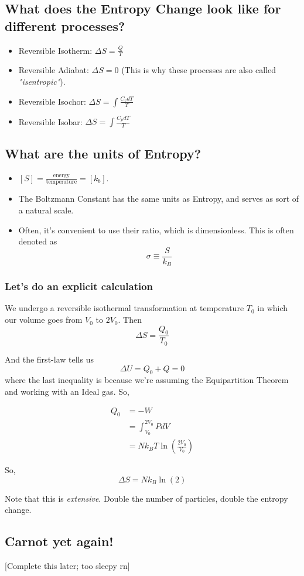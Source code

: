 \documentclass{article}
\begin{document}
\vskip 1cm
\subsection*{What does the Entropy Change look like for different processes?}

\vskip 0.5cm
\begin{itemize}
  \item Reversible Isotherm: $\Delta S = \frac{Q}{T}$
  \item Reversible Adiabat: $\Delta S = 0$ (This is why these processes are also called \emph{"isentropic"}).
  \item Reversible Isochor: $\Delta S = \int \frac{C_v dT}{T}$
  \item Reversible Isobar: $\Delta S = \int \frac{C_p dT}{T}$
\end{itemize}

\vskip 0.5cm
\subsection*{What are the units of Entropy?}
\vskip 0.5cm
\begin{itemize}
  \item $[S] = \frac{\text{energy}}{\text{temperature}} = [k_b]$.
  \item The Boltzmann Constant has the same units as Entropy, and serves as sort of a natural scale.
  \item Often, it's convenient to use their ratio, which is dimensionless. This is often denoted as 
  \[ \sigma \equiv \frac{S}{k_B} \]
\end{itemize}

\vskip 1cm
\subsubsection*{Let's do an explicit calculation}
\vskip 0.25cm
We undergo a reversible isothermal transformation at temperature $T_0$ in which our volume goes from $V_0$ to $2V_0$. Then 
\[ \Delta S = \frac{Q_0}{T_0} \]

And the first-law tells us 
\[ \Delta U = Q_0 + Q = 0  \]
where the last inequality is because we're assuming the Equipartition Theorem and working with an Ideal gas. So,

\begin{align*}
  Q_0 &= - W \\
  &= \int_{V_0}^{2V_0} P dV \\
  &= Nk_B T \ln \left( \frac{2V_0}{V_0} \right)
\end{align*}

So, 
\[ \boxed{ \Delta S = N k_B \ln(2)} \]

Note that this is \emph{extensive}. Double the number of particles, double the entropy change.

\vskip 1cm
\subsection{Carnot yet again!}

[Complete this later; too sleepy rn]

\end{document}
